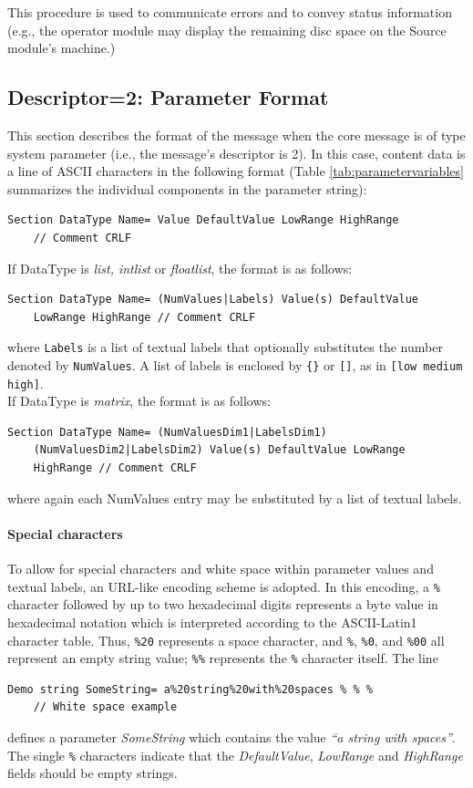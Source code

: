 \documentclass[letterpaper,oneside,12pt]{book}
\begin{document}
This procedure is used to communicate errors and to convey status information (e.g.,
the operator module may display the remaining disc space on the Source module's
machine.)

\subsection{Descriptor=2: Parameter Format}
\label{parameter_format}

This section describes the format of the message when the core message is of 
type system parameter (i.e., the message's descriptor is 2). In this case, 
content data is a line of ASCII characters in the following format 
(Table \ref{tab:parametervariables} summarizes
the individual components in the parameter string):
\begin{verbatim}
Section DataType Name= Value DefaultValue LowRange HighRange
    // Comment CRLF
\end{verbatim}
If DataType is \textit{list, intlist} or \textit{floatlist}, the format is
as follows: 
\begin{verbatim}
Section DataType Name= (NumValues|Labels) Value(s) DefaultValue
    LowRange HighRange // Comment CRLF
\end{verbatim}
where \texttt{Labels} is a list of textual labels that optionally substitutes the number denoted by \texttt{NumValues}. A list of labels is enclosed by \verb|{}| or \verb|[]|, as in 
\verb|[low medium high]|.
\\[2ex]
If DataType is \textit{matrix}, the format is as follows:
\begin{verbatim}
Section DataType Name= (NumValuesDim1|LabelsDim1)
    (NumValuesDim2|LabelsDim2) Value(s) DefaultValue LowRange
    HighRange // Comment CRLF
\end{verbatim}
where again each NumValues entry may be substituted by a list of textual labels.

\paragraph{Special characters} To allow for special characters and white space 
within parameter values and textual labels, an URL-like encoding scheme is adopted.
In this encoding, a \texttt{\%} character followed by up to two hexadecimal digits 
represents a byte value in hexadecimal notation which is interpreted according to 
the ASCII-Latin1 character table.
Thus, \texttt{\%20} represents a space character, and \texttt{\%}, \texttt{\%0}, 
and \texttt{\%00} all represent an empty string value; \texttt{\%\%} represents the
\texttt{\%} character itself.
The line
\begin{verbatim}
Demo string SomeString= a%20string%20with%20spaces % % % 
    // White space example
\end{verbatim}
defines a parameter \textit{SomeString} which contains the value \textit{``a string
with spaces''}. The single \texttt{\%} characters indicate that the \textit{DefaultValue},
\textit{LowRange} and \textit{HighRange} fields should be empty strings.
\end{document}
